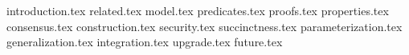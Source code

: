 {introduction.tex}
{related.tex}
{model.tex}
{predicates.tex}
{proofs.tex}
{properties.tex}
{consensus.tex}
{construction.tex}
{security.tex}
{succinctness.tex}
{parameterization.tex}
{generalization.tex}
{integration.tex}
{upgrade.tex}
{future.tex}

